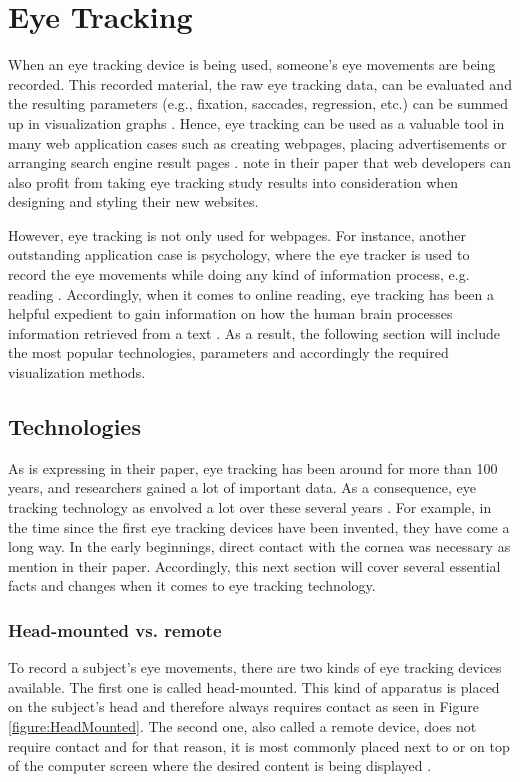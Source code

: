 \section{Eye Tracking}
\label{section:EyeTracking}
When an eye tracking device is being used, someone's eye movements are being recorded. This recorded material, the raw eye tracking data, can be evaluated and the resulting parameters (e.g., fixation, saccades, regression, etc.) can be summed up in visualization graphs \autocite[]{goldberg2002eye, poole2006eye, beymer2007eye}. Hence, eye tracking can be used as a valuable tool in many web application cases such as creating webpages, placing advertisements or arranging search engine result pages \autocite{buscher2009you, liu2015influence}. \textcite[]{buscher2009you} note in their paper that web developers can also profit from taking eye tracking study results into consideration when designing and styling their new websites. 

However, eye tracking is not only used for webpages. For instance, another outstanding application case is psychology, where the eye tracker is used to record the eye movements while doing any kind of information process, e.g. reading \autocite{schiessl2003eye}.
Accordingly, when it comes to online reading, eye tracking has been a helpful expedient to gain information on how the human brain processes information retrieved from a text \autocite[]{schiessl2003eye}.
As a result, the following section will include the most popular technologies, parameters and accordingly the required visualization methods. 

\subsection{Technologies}
\label{subsection:Technologies}
As \textcite[]{biedert2010eyebook} is expressing in their paper, eye tracking has been around for more than 100 years, and researchers gained a lot of important data. As a consequence, eye tracking technology as envolved a lot over these several years \autocite[]{poole2006eye}.
For example, in the time since the first eye tracking devices have been invented, they have come a long way. In the early beginnings, direct contact with the cornea was necessary as \textcite[]{jacob2003eye} mention in their paper.
Accordingly, this next section will cover several essential facts and changes when it comes to eye tracking technology.

\subsubsection{Head-mounted vs. remote}
To record a subject's eye movements, there are two kinds of eye tracking devices available. The first one is called head-mounted. This kind of apparatus is placed on the subject's head and therefore always requires contact as seen in Figure \ref{figure:HeadMounted}. 
The second one, also called a remote device, does not require contact and for that reason, it is most commonly placed next to or on top of the computer screen where the desired content is being displayed \autocite[]{jacob2003eye, schiessl2003eye}.

